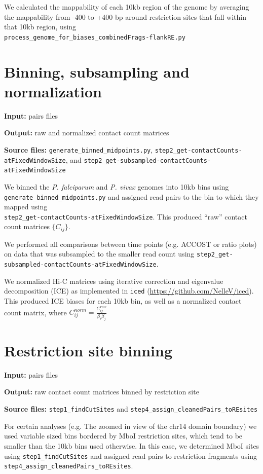 \documentclass[11pt]{amsart}
\begin{document}
We calculated the mappability of each 10kb region of the genome by averaging the mappability from -400 to +400 bp around restriction sites that fall within that 10kb region, using
\\
\texttt{process\_genome\_for\_biases\_combinedFrags-flankRE.py}


\section{Binning, subsampling and normalization}

\textbf{Input:} pairs files

\textbf{Output:} raw and normalized contact count matrices 

\textbf{Source files:} \texttt{generate\_binned\_midpoints.py}, \texttt{step2\_get-contactCounts-atFixedWindowSize}, and \texttt{step2\_get-subsampled-contactCounts-atFixedWindowSize}

We binned the \textit{P. falciparum} and \textit{P. vivax} genomes into 10kb bins using \texttt{generate\_binned\_midpoints.py} and assigned read pairs to the bin to which they mapped using
\\
\texttt{step2\_get-contactCounts-atFixedWindowSize}. This produced ``raw'' contact count matrices $ \{ C_{ij} \} $.

We performed all comparisons between time points (e.g. ACCOST or ratio plots) on data that was subsampled to the smaller read count using \texttt{step2\_get-subsampled-contactCounts-atFixedWindowSize}.

We normalized Hi-C matrices using iterative correction and eigenvalue decomposition (ICE) as implemented in \texttt{iced} (\url{https://github.com/NelleV/iced}). This produced ICE biases for each 10kb bin, as well as a normalized contact count matrix, where $C_{ij}^{norm} = \frac{C_{ij}^{raw}}{\beta_i\beta_j}$

\section{Restriction site binning}

\textbf{Input:} pairs files

\textbf{Output:} raw contact count matrices binned by restriction site

\textbf{Source files:} \texttt{step1\_findCutSites} and \texttt{step4\_assign\_cleanedPairs\_toREsites}

For certain analyses (e.g. The zoomed in view of the chr14 domain boundary) we used variable sized bins bordered by MboI restriction sites, which tend to be smaller than the 10kb bins used otherwise. In this case, we determined MboI sites using \texttt{step1\_findCutSites} and assigned read pairs to restriction fragments using \texttt{step4\_assign\_cleanedPairs\_toREsites}.
\end{document}

